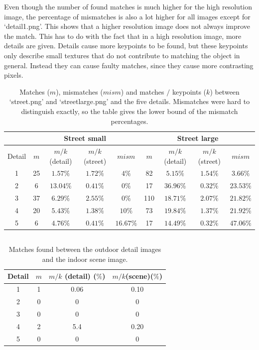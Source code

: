 \documentclass{article}
\begin{document}
Even though the number of found matches is much higher for the high resolution image, the percentage of mismatches is also a lot higher for all images except for `detail1.png'. This shows that a higher resolution image does not always improve the match. This has to do with the fact that in a high resolution image, more details are given. Details cause more keypoints to be found, but these keypoints only describe small textures that do not contribute to matching the object in general. Instead they can cause faulty matches, since they cause more contrasting pixels.

\begin{table}[H]
 \centering
 \caption{Matches ($m$), mismatches ($mism$) and matches $/$ keypoints ($k$) between `street.png' and `streetlarge.png' and the five details. Mismatches were hard to distinguish exactly, so the table gives the lower bound of the mismatch percentages.}
 \label{table1}
 \begin{tabular}{|c|c|c|c|c||c|c|c|c|}
 \hline
 & \multicolumn{4}{c||}{Street small} & \multicolumn{4}{c|}{Street large} \\
 \hline
  Detail & $m$ & $m/k$ (detail) & $m/k$(street) & $mism$ & $m$ & $m/k$ (detail) & $m/k$(street) & $mism$ \\
  \hline
  1 & 25 & $1.57\%$ & $1.72\%$ & $4\%$ & 82 & $5.15\%$ & $1.54\%$ & $3.66\%$ \\
  2 & 6 & $13.04\%$ & $0.41\%$ & $0\%$ & 17 & $36.96\%$ & $0.32\%$ & $23.53\%$ \\
  3 & 37 & $6.29\%$ & $2.55\%$ & $0\%$ & 110 & $18.71\%$ & $2.07\%$ & $21.82\%$ \\
  4 & 20 & $5.43\%$ & $1.38\%$ & $10\%$ & 73 & $19.84\%$ & $1.37\%$ & $21.92\%$ \\
  5 & 6 & $4.76\%$ & $0.41\%$ & $16.67\%$ & 17 & $14.49\%$ & $0.32\%$ & $47.06\%$ \\
  \hline
 \end{tabular}
\end{table}

\subsection{}

\begin{table}[H]
\centering
 \caption{Matches found between the outdoor detail images and the indoor scene image.}
 \label{table2}
 \begin{tabular}{|c|c|c|c|}
 \hline
  Detail & $m$ & $m/k$ (detail) ($\%$) & $m/k$(scene)($\%$) \\
  \hline
  1 & 1 & 0.06 & 0.10 \\
  2 & 0 & 0 & 0 \\
  3 & 0 & 0 & 0 \\
  4 & 2 & 5.4 & 0.20 \\
  5 & 0 & 0 & 0 \\
  \hline
 \end{tabular}
\end{table}
\end{document}
